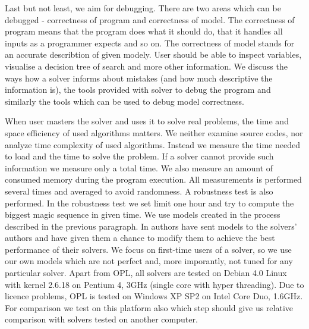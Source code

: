 Last but not least, we aim for debugging. There are two areas which can be 
debugged - correctness of program and correctness of model. The correctness of 
program means that the program does what it should do, that it handles all inputs as a programmer expects and so on. 
The correctness of model stands for an accurate describtion of given modely. User should be able to 
inspect variables, visualise a decision tree of search and more other information. 
We discuss the ways how a solver informs about mistakes (and how much descriptive the 
information is), the tools provided with solver to debug the program and similarly the 
tools which can be used to debug model correctness.

When user masters the solver and uses it to solve real problems, the time and space 
efficiency of used algorithms matters. We neither examine source codes, nor analyze 
time complexity of used algorithms. Instead we measure the time needed to 
load and the time to solve the problem. If a solver cannot provide such information 
we measure only a total time. We also measure an amount of consumed memory 
during the program execution. All measurements is performed several times 
and averaged to avoid randomness. A robustness test is also performed. 
In the robustness test we set limit one hour and try to compute the biggest magic 
sequence in given time. We use models created in the process described in the previous 
paragraph. In \cite{fernandez00} authors have sent models to the solvers' authors and 
have given them a chance to modify them to achieve the best performance of their solvers. 
We focus on first-time users of a solver, so we use our own models which are 
not perfect and, more imporantly, not tuned for any particular solver. Apart from OPL, all solvers 
are tested on Debian 4.0  Linux with kernel 2.6.18 on Pentium 4, 3GHz (single core 
with hyper threading). Due to licence problems, OPL is tested on Windows XP 
SP2 on Intel Core Duo, 1.6GHz. For comparison we test on this platform also 
\eclipse which step should give us relative comparison with solvers tested on another 
computer.